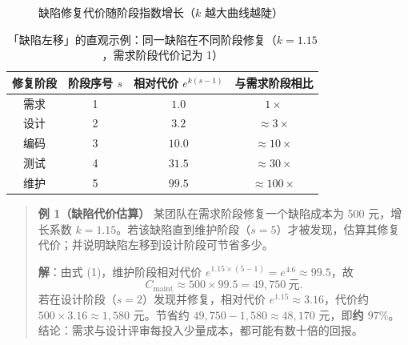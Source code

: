 \begin{figure}[H]
\centering
{}
\caption{缺陷修复代价随阶段指数增长（$k$ 越大曲线越陡）}
\end{figure}

\begin{table}[H]
\centering
\caption{「缺陷左移」的直观示例：同一缺陷在不同阶段修复（$k=1.15$，需求阶段代价记为 1）}
\begin{tabulary}{\textwidth}{CCCC}
\toprule
修复阶段 & 阶段序号 $s$ & 相对代价 $e^{k(s-1)}$ & 与需求阶段相比 \\
\midrule
需求 & 1 & $1.0$ & $1\times$ \\
设计 & 2 & $3.2$ & $\approx 3\times$ \\
编码 & 3 & $10.0$ & $\approx 10\times$ \\
测试 & 4 & $31.5$ & $\approx 30\times$ \\
维护 & 5 & $99.5$ & $\approx 100\times$ \\
\bottomrule
\end{tabulary}
\end{table}

\begin{quote}
\textbf{例 1（缺陷代价估算）} 某团队在需求阶段修复一个缺陷成本为 500 元，增长系数 $k=1.15$。若该缺陷直到维护阶段（$s=5$）才被发现，估算其修复代价；并说明缺陷左移到设计阶段可节省多少。

\textbf{解}：由式 (1)，维护阶段相对代价 $e^{1.15\times(5-1)}=e^{4.6}\approx 99.5$，故
\[
C_{\text{maint}} \approx 500 \times 99.5 = 49{,}750\ \text{元}.
\]
若在设计阶段（$s=2$）发现并修复，相对代价 $e^{1.15}\approx 3.16$，代价约 $500\times 3.16\approx 1{,}580$ 元。节省约 $49{,}750-1{,}580\approx 48{,}170$ 元，即\textbf{约 $97\%$}。结论：需求与设计评审每投入少量成本，都可能有数十倍的回报。
\end{quote}

